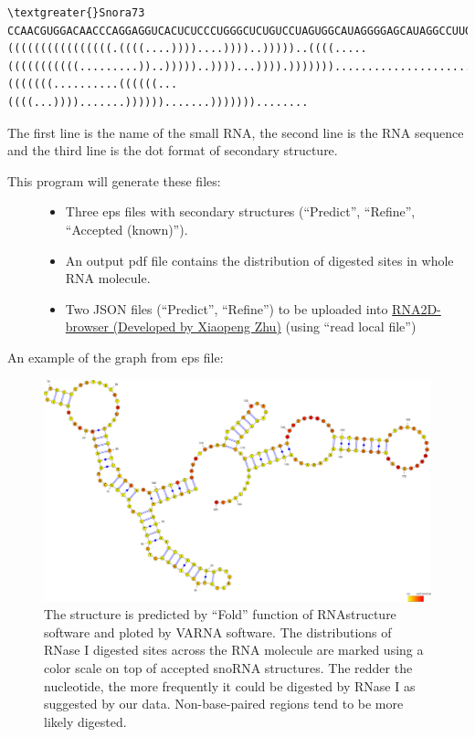 \documentclass[letterpaper,10pt,english]{sphinxmanual}
\begin{document}
\begin{Verbatim}[commandchars=\\\{\}]
\textgreater{}Snora73
CCAACGUGGACAACCCAGGAGGUCACUCUCCCUGGGCUCUGUCCUAGUGGCAUAGGGGAGCAUAGGCCUUGCCCAGUGACGUACAGUCCCUUUCCACGGCGUUGGAGAUGAAGCUGGGCUUUGUGCCCGCGCCUGCAUAUUCCUACGACUUCUCAGAGUCCUGUGGACAGUGACUGAGGAGGCAAACCAUGCAGGAAACAGUG
((((((((((((((((.((((....))))....))))..)))))..((((.....(((((((((((.........))..)))))..))))...)))).)))))))..........................(((((((..........((((((...((((...)))).......)))))).......)))))))........
\end{Verbatim}

The first line is the name of the small RNA, the second line is the RNA sequence and the third line is the dot format of secondary structure.
\begin{description}
\item[{This program will generate these files:}] \leavevmode\begin{itemize}
\item {} 
Three eps files with secondary structures (``Predict'', ``Refine'', ``Accepted (known)'').

\item {} 
An output pdf file contains the distribution of digested sites in whole RNA molecule.

\item {} 
Two JSON files (``Predict'', ``Refine'') to be uploaded into \href{http://circos.zhu.land/}{RNA2D-browser (Developed by Xiaopeng Zhu)} (using ``read local file'')

\end{itemize}

\end{description}

An example of the graph from eps file:
\begin{figure}[htbp]
\centering
\capstart

\includegraphics{structure_ENSMUSG00000064380-SNORA73_cm_refine.jpg}
\caption{The structure is predicted by ``Fold'' function of RNAstructure software and ploted by VARNA software. The distributions of RNase I digested sites across the RNA molecule are marked using a color scale on top of accepted snoRNA structures. The redder the nucleotide, the more frequently it could be digested by RNase I as suggested by our data. Non-base-paired regions tend to be more likely digested.}\end{figure}
\end{document}
